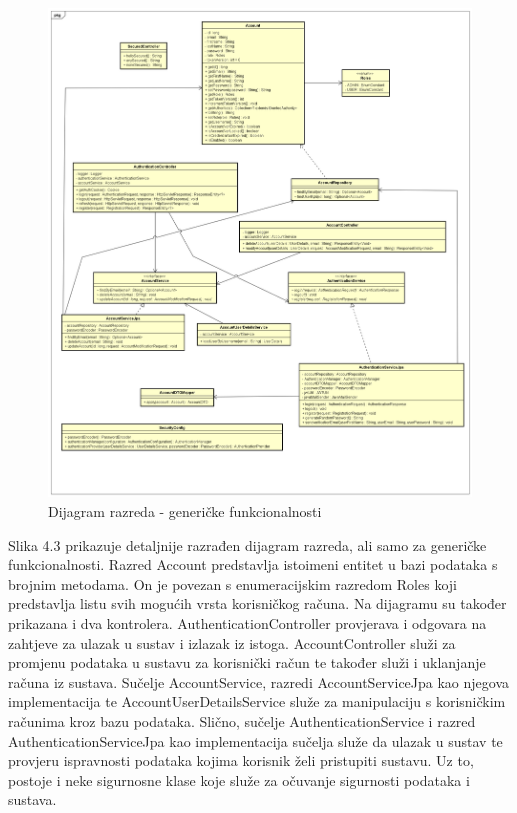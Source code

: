 			\begin{figure}[H]
				\includegraphics[width=\textwidth]{slike/ClassDiagram0.PNG}
				\caption{Dijagram razreda - generičke funkcionalnosti}
				\label{fig:classDiagram0}
			\end{figure}
			
			\newpage
			
			Slika 4.3 prikazuje detaljnije razrađen dijagram razreda, ali samo za generičke funkcionalnosti. Razred Account predstavlja istoimeni entitet u bazi podataka s brojnim metodama. On je povezan s enumeracijskim razredom Roles koji predstavlja listu svih mogućih vrsta korisničkog računa. Na dijagramu su također prikazana i dva kontrolera. AuthenticationController provjerava i odgovara na zahtjeve za ulazak u sustav i izlazak iz istoga. AccountController služi za promjenu podataka u sustavu za korisnički račun te također služi i uklanjanje računa iz sustava. Sučelje AccountService, razredi AccountServiceJpa kao njegova implementacija te AccountUserDetailsService služe za manipulaciju s korisničkim računima kroz bazu podataka. Slično, sučelje AuthenticationService i razred AuthenticationServiceJpa kao implementacija sučelja služe da ulazak u sustav te provjeru ispravnosti podataka kojima korisnik želi pristupiti sustavu. Uz to, postoje i neke sigurnosne klase koje služe za očuvanje sigurnosti podataka i sustava.
			
